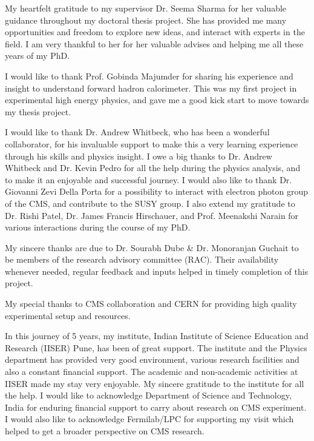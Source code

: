 \documentclass[
11pt, %
english, %
singlespacing, %
headsepline, %
]{MastersDoctoralThesis} %
\begin{document}
\begin{acknowledgements}
\addchaptertocentry{\acknowledgementname} %
My heartfelt gratitude to my supervisor Dr. Seema Sharma for her valuable guidance throughout my doctoral thesis project. She has provided 
me many opportunities and freedom to explore new ideas, and interact with experts in the field. I am very thankful to her for her valuable 
advises and helping me all these years of my PhD.

I would like to thank Prof. Gobinda Majumder for sharing his experience and insight to understand forward hadron calorimeter. This was my 
first project in experimental high energy physics, and gave me a good kick start to move towards my thesis project. 

I would like to thank Dr. Andrew Whitbeck, who has been a wonderful collaborator, for his invaluable support to make this a very learning 
experience through his skills and physics insight. I owe a big thanks to Dr. Andrew Whitbeck and Dr. Kevin Pedro for all the help during 
the physics analysis, and to make it an enjoyable and successful journey. I would also like to thank Dr. Giovanni Zevi Della Porta for a 
possibility to interact with electron photon group of the CMS, and contribute to the SUSY group. I also extend my gratitude to Dr. Rishi 
Patel, Dr. James Francis Hirschauer, and Prof. Meenakshi Narain for various interactions during the course of my PhD. 

My sincere thanks are due to Dr. Sourabh Dube \& Dr. Monoranjan Guchait to be members of the research advisory committee (RAC). Their 
availability whenever needed, regular feedback and inputs helped in timely completion of this project.

My special thanks to CMS collaboration and CERN for providing high quality
experimental setup and resources.

In this journey of 5 years, my institute, Indian Institute of Science Education and
Research (IISER) Pune, has been of great support. The institute and the Physics
department has provided very good environment, various research facilities and
also a constant financial support. The academic and non-academic activities at IISER made my stay very enjoyable. My sincere gratitude to the institute for all the help. I would like to acknowledge Department of Science and Technology, 
India for enduring financial support to carry about research on CMS experiment. I would also like to acknowledge Fermilab/LPC for 
supporting my visit which helped to get a broader perspective on CMS research. 



\end{acknowledgements}
\end{document}
